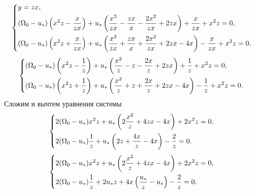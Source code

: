 \documentclass[a4paper,12pt, openany]{book}
\theoremstyle{plain} %
\theoremstyle{definition} %
\theoremstyle{remark} %
\numberwithin{equation}{chapter}
\begin{document}
{\begin{equation}\label{fullchanged1}
    \left\{ {\begin{aligned}
                 & y=zx, \hfill                                                                                                                                 \\
                 & (\Omega_0-u_*)\left( x^2z-\frac{x}{zx}\right)+u_*\left(\frac{x^3}{zx}-\frac{zx}{x}-\frac{2x^2}{zx}+2zx\right)+\frac{x}{zx}+x^2z=0, \hfill    \\
                 & (\Omega_0-u_*)\left( x^2z+\frac{x}{zx}\right)+u_*\left(\frac{x^3}{zx}+\frac{zx}{x}+\frac{2x^2}{zx}+2zx-4x\right)-\frac{x}{zx}+x^2z=0. \hfill \\
            \end{aligned}} \right.
\end{equation}
\begin{equation}
    \left\{ {\begin{aligned}
                 & (\Omega_0-u_*)\left( x^2z-\frac{1}{z}\right)+u_*\left(\frac{x^2}{z}-z-\frac{2x}{z}+2zx\right)+\frac{1}{z}+x^2z=0, \hfill    \\
                 & (\Omega_0-u_*)\left( x^2z+\frac{1}{z}\right)+u_*\left(\frac{x^2}{z}+z+\frac{2x}{z}+2zx-4x\right)-\frac{1}{z}+x^2z=0. \hfill \\
            \end{aligned}} \right.
\end{equation}
Сложим и вычтем уравнения системы
\begin{equation}
    \left\{ {\begin{aligned}
                 & 2(\Omega_0-u_*)x^2z+u_*\left(2\frac{x^2}{z}+4zx-4x\right)+2x^2z=0, \hfill           \\
                 & 2(\Omega_0-u_*)\frac{1}{z}+u_*\left(2z+\frac{4x}{z}-4x\right)-\frac{2}{z}=0. \hfill \\
            \end{aligned}} \right.
\end{equation}
\begin{equation}
    \left\{ {\begin{aligned}
                 & 2(\Omega_0-u_*)x^2z+u_*\left(2\frac{x^2}{z}+4zx-4x\right)+2x^2z=0, \hfill               \\
                 & 2(\Omega_0-u_*)\frac{1}{z}+2u_*z+4x\left(\frac{u_*}{z}-u_*\right)-\frac{2}{z}=0. \hfill \\
            \end{aligned}} \right.
\end{equation}
}
\end{document}
